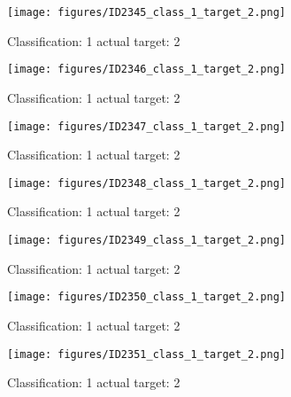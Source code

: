 \begin{figure}[h!]
\begin{center}
\texttt{[image: figures/ID2345\_class\_1\_target\_2.png]}
\end{center}
\caption{ Classification: 1 actual target: 2}
\label{fig:ID2345_class_1_target_2}
\end{figure}
\begin{figure}[h!]
\begin{center}
\texttt{[image: figures/ID2346\_class\_1\_target\_2.png]}
\end{center}
\caption{ Classification: 1 actual target: 2}
\label{fig:ID2346_class_1_target_2}
\end{figure}
\begin{figure}[h!]
\begin{center}
\texttt{[image: figures/ID2347\_class\_1\_target\_2.png]}
\end{center}
\caption{ Classification: 1 actual target: 2}
\label{fig:ID2347_class_1_target_2}
\end{figure}
\begin{figure}[h!]
\begin{center}
\texttt{[image: figures/ID2348\_class\_1\_target\_2.png]}
\end{center}
\caption{ Classification: 1 actual target: 2}
\label{fig:ID2348_class_1_target_2}
\end{figure}
\begin{figure}[h!]
\begin{center}
\texttt{[image: figures/ID2349\_class\_1\_target\_2.png]}
\end{center}
\caption{ Classification: 1 actual target: 2}
\label{fig:ID2349_class_1_target_2}
\end{figure}
\begin{figure}[h!]
\begin{center}
\texttt{[image: figures/ID2350\_class\_1\_target\_2.png]}
\end{center}
\caption{ Classification: 1 actual target: 2}
\label{fig:ID2350_class_1_target_2}
\end{figure}
\begin{figure}[h!]
\begin{center}
\texttt{[image: figures/ID2351\_class\_1\_target\_2.png]}
\end{center}
\caption{ Classification: 1 actual target: 2}
\label{fig:ID2351_class_1_target_2}
\end{figure}

